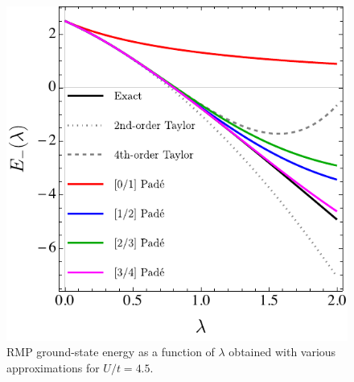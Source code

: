 \documentclass[aps,prb,reprint,noshowkeys,linenumbers,superscriptaddress]{revtex4-1}
\begin{document}
\begin{figure}
    \includegraphics[width=\linewidth]{PadeRMP}
    \caption{\label{fig:PadeRMP}
    RMP ground-state energy as a function of $\lambda$ obtained with various approximations for $U/t = 4.5$.}
\end{figure}

\end{document}
